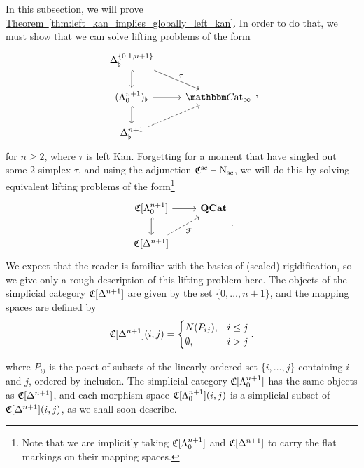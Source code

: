 \documentclass[main.tex]{subfiles}
\begin{document}
In this subsection, we will prove \hyperref[thm:left_kan_implies_globally_left_kan]{Theorem~\ref*{thm:left_kan_implies_globally_left_kan}}. In order to do that, we must show that we can solve lifting problems of the form
\begin{equation*}
  \label{eq:specific_left_horns_in_cat_infty_bicategories}
  \begin{tikzcd}
    \Delta^{\{0, 1, n+1\}}_{\flat}
    \arrow[d, hook]
    \arrow[dr, "\tau"]
    \\
    (\Lambda^{n+1}_{0})_{\flat}
    \arrow[r]
    \arrow[d, hook]
    & \ICCat
    \\
    \Delta^{n+1}_{\flat}
    \arrow[ur, dashed]
  \end{tikzcd},
\end{equation*}
for $n \geq 2$, where $\tau$ is left Kan. Forgetting for a moment that have singled out some $2$-simplex $\tau$, and using the adjunction $\mathfrak{C}^{\mathrm{sc}} \dashv \mathrm{N}_{\mathrm{sc}}$, we will do this by solving equivalent lifting problems of the form\footnote{Note that we are implicitly taking $\mathfrak{C}[\Lambda^{n+1}_{0}]$ and $\mathfrak{C}[\Delta^{n+1}]$ to carry the flat markings on their mapping spaces.}
\begin{equation}
  \label{eq:left_horns_in_cat_infty_scaled}
  \begin{tikzcd}
    \C[\Lambda^{n+1}_{0}]
    \arrow[r]
    \arrow[d, hook]
    & \QCat
    \\
    \C[\Delta^{n+1}]
    \arrow[ur, dashed, swap, "\mathcal{F}"]
  \end{tikzcd}.
\end{equation}
We expect that the reader is familiar with the basics of (scaled) rigidification, so we give only a rough description of this lifting problem here. The objects of the simplicial category $\mathfrak{C}[\Delta^{n+1}]$ are given by the set $\{0, \ldots, n+1\}$, and the mapping spaces are defined by
\begin{equation*}
  \mathfrak{C}[\Delta^{n+1}](i, j) =
  \begin{cases}
    N(P_{ij}), &i \leq j \\
    \emptyset, & i > j
  \end{cases}.
\end{equation*}

where $P_{ij}$ is the poset of subsets of the linearly ordered set $\{i, \ldots, j\}$ containing $i$ and $j$, ordered by inclusion. The simplicial category $\mathfrak{C}[\Lambda^{n+1}_{0}]$ has the same objects as $\mathfrak{C}[\Delta^{n+1}]$, and each morphism space $\mathfrak{C}[\Lambda^{n+1}_{0}](i, j)$ is a simplicial subset of $\mathfrak{C}[\Delta^{n+1}](i, j)$, as we shall soon describe.
\end{document}
